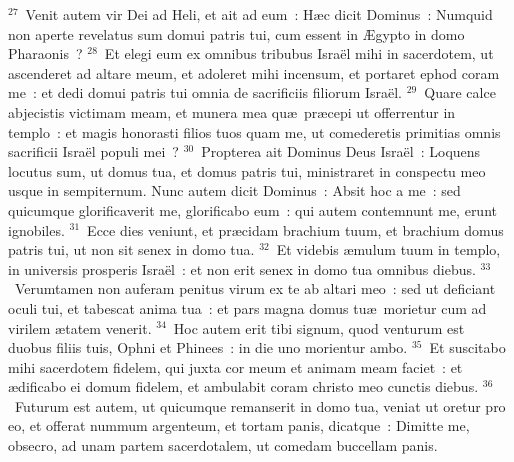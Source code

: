 ${}^{27}$~Venit autem vir Dei ad Heli, et ait ad eum~: H\ae c dicit Dominus~: Numquid non aperte revelatus sum domui patris tui, cum essent in \AE gypto in domo Pharaonis~?
${}^{28}$~Et elegi eum ex omnibus tribubus Isra\"el mihi in sacerdotem, ut ascenderet ad altare meum, et adoleret mihi incensum, et portaret ephod coram me~: et dedi domui patris tui omnia de sacrificiis filiorum Isra\"el.
${}^{29}$~Quare calce abjecistis victimam meam, et munera mea qu\ae\ pr\ae cepi ut offerrentur in templo~: et magis honorasti filios tuos quam me, ut comederetis primitias omnis sacrificii Isra\"el populi mei~?
${}^{30}$~Propterea ait Dominus Deus Isra\"el~: Loquens locutus sum, ut domus tua, et domus patris tui, ministraret in conspectu meo usque in sempiternum. Nunc autem dicit Dominus~: Absit hoc a me~: sed quicumque glorificaverit me, glorificabo eum~: qui autem contemnunt me, erunt ignobiles.
${}^{31}$~Ecce dies veniunt, et pr\ae cidam brachium tuum, et brachium domus patris tui, ut non sit senex in domo tua.
${}^{32}$~Et videbis \ae mulum tuum in templo, in universis prosperis Isra\"el~: et non erit senex in domo tua omnibus diebus.
${}^{33}$~Verumtamen non auferam penitus virum ex te ab altari meo~: sed ut deficiant oculi tui, et tabescat anima tua~: et pars magna domus tu\ae\ morietur cum ad virilem \ae tatem venerit.
${}^{34}$~Hoc autem erit tibi signum, quod venturum est duobus filiis tuis, Ophni et Phinees~: in die uno morientur ambo.
${}^{35}$~Et suscitabo mihi sacerdotem fidelem, qui juxta cor meum et animam meam faciet~: et \ae dificabo ei domum fidelem, et ambulabit coram christo meo cunctis diebus.
${}^{36}$~Futurum est autem, ut quicumque remanserit in domo tua, veniat ut oretur pro eo, et offerat nummum argenteum, et tortam panis, dicatque~: Dimitte me, obsecro, ad unam partem sacerdotalem, ut comedam buccellam panis.

